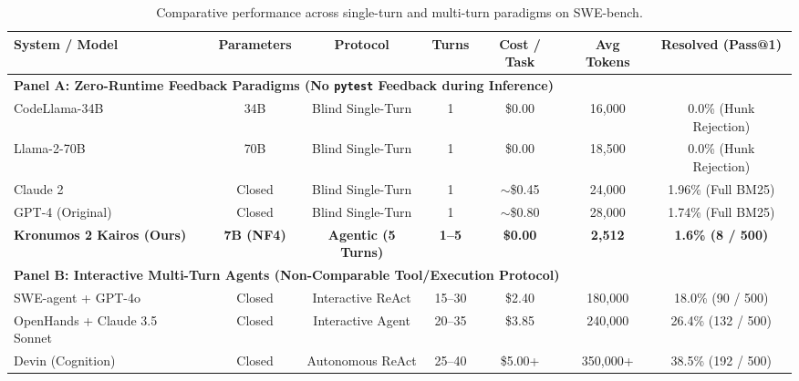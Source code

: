 \documentclass[10pt,twocolumn,letterpaper]{article}
\begin{document}
\begin{table}[t]
\centering
\small
\caption{Comparative performance across single-turn and multi-turn paradigms on SWE-bench.}
\begin{tabular}{lcccccc}
\toprule
\textbf{System / Model} & \textbf{Parameters} & \textbf{Protocol} & \textbf{Turns} & \textbf{Cost / Task} & \textbf{Avg Tokens} & \textbf{Resolved (Pass@1)} \\
\midrule
\multicolumn{7}{l}{\textbf{Panel A: Zero-Runtime Feedback Paradigms (No \texttt{pytest} Feedback during Inference)}} \\
\midrule
CodeLlama-34B~\cite{roziere2023code} & 34B & Blind Single-Turn & 1 & \$0.00 & 16,000 & 0.0\% (Hunk Rejection) \\
Llama-2-70B~\cite{jimenez2024swebench} & 70B & Blind Single-Turn & 1 & \$0.00 & 18,500 & 0.0\% (Hunk Rejection) \\
Claude 2~\cite{jimenez2024swebench} & Closed & Blind Single-Turn & 1 & $\sim$\$0.45 & 24,000 & 1.96\% (Full BM25) \\
GPT-4 (Original)~\cite{jimenez2024swebench} & Closed & Blind Single-Turn & 1 & $\sim$\$0.80 & 28,000 & 1.74\% (Full BM25) \\
\textbf{Kronumos 2 Kairos (Ours)} & \textbf{7B (NF4)} & \textbf{Agentic (5 Turns)} & \textbf{1--5} & \textbf{\$0.00} & \textbf{2,512} & \textbf{1.6\% (8 / 500)} \\
\midrule
\multicolumn{7}{l}{\textbf{Panel B: Interactive Multi-Turn Agents (Non-Comparable Tool/Execution Protocol)}} \\
\midrule
SWE-agent + GPT-4o~\cite{yang2024sweagent} & Closed & Interactive ReAct & 15--30 & \$2.40 & 180,000 & 18.0\% (90 / 500) \\
OpenHands + Claude 3.5 Sonnet~\cite{wang2024openhands} & Closed & Interactive Agent & 20--35 & \$3.85 & 240,000 & 26.4\% (132 / 500) \\
Devin (Cognition) & Closed & Autonomous ReAct & 25--40 & \$5.00+ & 350,000+ & 38.5\% (192 / 500) \\
\bottomrule
\end{tabular}
\label{tab:comparative}
\end{table}
\end{document}
